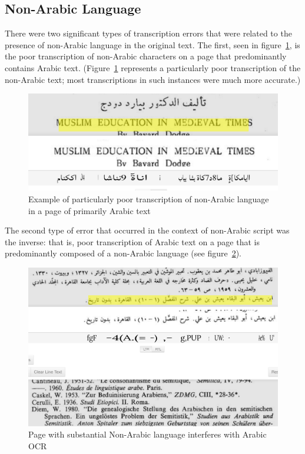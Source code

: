 \subsection{Non-Arabic Language}

There were two significant types of transcription errors that were related to
the presence of non-Arabic language in the original text. The first, seen in
figure~\ref{fig3:fig25}, is the poor transcription of non-Arabic characters on a
page that predominantly contains Arabic text. (Figure~\ref{fig3:fig25}
represents a particularly poor transcription of the non-Arabic text; most
transcriptions in such instances were much more accurate.)

\begin{figure}[!ht]
	\centering
	\includegraphics[width=\linewidth]{images/image12.png}
	\caption{Example of particularly poor transcription of non-Arabic language in a page of primarily Arabic text}
	\label{fig3:fig25}
\end{figure}
  
The second type of error that occurred in the context of non-Arabic script was
the inverse: that is, poor transcription of Arabic text on a page that is
predominantly composed of a non-Arabic language (see figure~\ref{fig3:fig26}). 

\begin{figure}[!ht]
	\centering
	\includegraphics[width=\linewidth]{images/image13.png}
	\caption{Page with substantial Non-Arabic language interferes with Arabic OCR}
	\label{fig3:fig26}
\end{figure}
 
